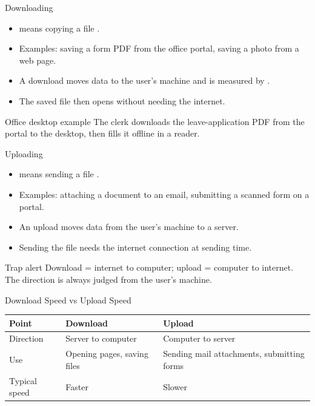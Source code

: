 \documentclass[aspectratio=169]{beamer}
\begin{document}
\begin{frame}{Downloading}
  \begin{itemize}
    \item {} means copying a file .
    \item Examples: saving a form PDF from the office portal, saving a
      photo from a web page.
    \item A download moves data  to the user's machine and is
      measured by .
    \item The saved file then opens without needing the internet.
  \end{itemize}
  \begin{exampleblock}{Office desktop example}
    The clerk downloads the leave-application PDF from the portal to the
    desktop, then fills it offline in a reader.
  \end{exampleblock}
\end{frame}

\begin{frame}{Uploading}
  \begin{itemize}
    \item {} means sending a file .
    \item Examples: attaching a document to an email, submitting a scanned
      form on a portal.
    \item An upload moves data  from the user's machine to a server.
    \item Sending the file needs the internet connection at sending time.
  \end{itemize}
  \begin{alertblock}{Trap alert}
    Download = internet to computer; upload = computer to internet.
    The direction is always judged from the user's machine.
  \end{alertblock}
\end{frame}

\begin{frame}{Download Speed vs Upload Speed}
  \begin{center}
    \begin{tabular}{lll}
      \toprule
      \textbf{Point} & \textbf{Download} & \textbf{Upload} \\
      \midrule
      Direction & Server to computer & Computer to server \\
      Use & Opening pages, saving files & Sending mail attachments, submitting forms \\
      Typical speed & Faster & Slower \\
      \bottomrule
    \end{tabular}
  \end{center}
  \vspace{0.25cm}
\end{frame}
\end{document}
